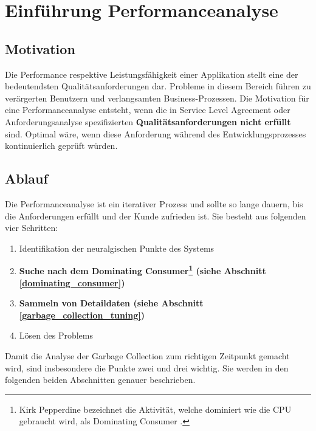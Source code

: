 \chapter{Einführung Performanceanalyse}

\section{Motivation}
Die Performance respektive Leistungsfähigkeit einer Applikation stellt eine der bedeutendsten Qualitätsanforderungen dar. Probleme in diesem Bereich führen zu verärgerten Benutzern und verlangsamten Business-Prozessen. Die Motivation für eine Performanceanalyse entsteht, wenn die in Service Level Agreement oder Anforderungsanalyse spezifizierten \textbf{Qualitätsanforderungen nicht erfüllt} sind. Optimal wäre, wenn diese Anforderung während des Entwicklungsprozesses kontinuierlich geprüft würden.

\section{Ablauf}
Die Performanceanalyse ist ein iterativer Prozess und sollte so lange dauern, bis die Anforderungen erfüllt und der Kunde zufrieden ist. Sie besteht aus folgenden vier Schritten\cite{hummelBeer201109}:
\begin{enumerate}
	\item Identifikation der neuralgischen Punkte des Systems
	\item \textbf{Suche nach dem Dominating Consumer\footnote{Kirk Pepperdine bezeichnet die Aktivität, welche dominiert wie die CPU gebraucht wird, als Dominating Consumer . } (siehe Abschnitt \ref{dominating_consumer})}
	\item \textbf{Sammeln von Detaildaten (siehe Abschnitt \ref{garbage_collection_tuning})}
	\item Lösen des Problems
\end{enumerate}


Damit die Analyse der Garbage Collection zum richtigen Zeitpunkt gemacht wird, sind insbesondere die Punkte zwei und drei wichtig. Sie werden in den folgenden beiden Abschnitten genauer beschrieben.
